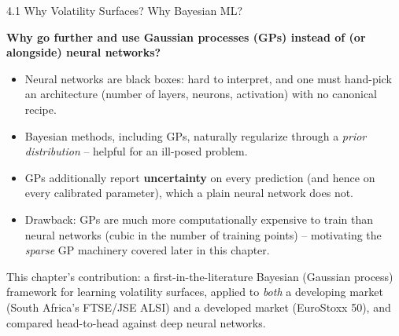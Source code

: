 \documentclass[aspectratio=169,10pt]{beamer}
\begin{document}
\begin{frame}[allowframebreaks]{4.1 Why Volatility Surfaces? Why Bayesian ML?}
\framebreak

\textbf{Why go further and use Gaussian processes (GPs) instead of (or
alongside) neural networks?}
\begin{itemize}
  \item Neural networks are black boxes: hard to interpret, and one must
        hand-pick an architecture (number of layers, neurons, activation)
        with no canonical recipe.
  \item Bayesian methods, including GPs, naturally regularize through a
        \emph{prior distribution} -- helpful for an ill-posed problem.
  \item GPs additionally report \textbf{uncertainty} on every prediction
        (and hence on every calibrated parameter), which a plain neural
        network does not.
  \item Drawback: GPs are much more computationally expensive to train
        than neural networks (cubic in the number of training points) --
        motivating the \emph{sparse} GP machinery covered later in this
        chapter.
\end{itemize}

This chapter's contribution: a first-in-the-literature Bayesian
(Gaussian process) framework for learning volatility surfaces, applied to
\emph{both} a developing market (South Africa's FTSE/JSE ALSI) and a
developed market (EuroStoxx 50), and compared head-to-head against deep
neural networks.

\end{frame}
\end{document}
